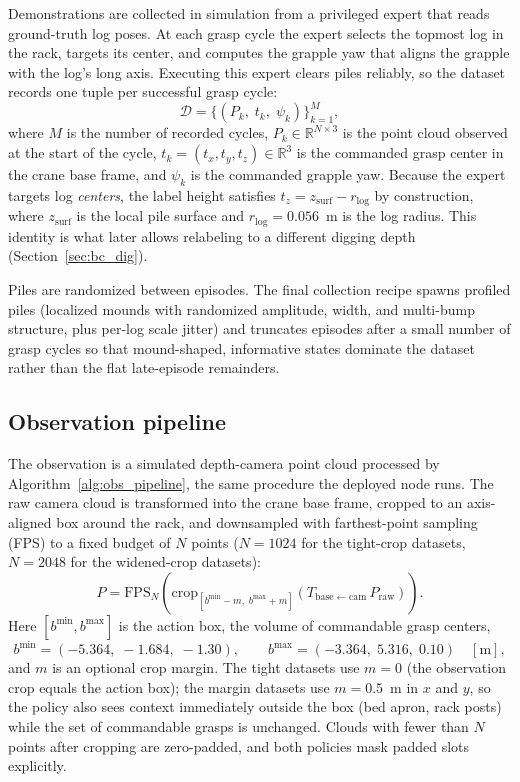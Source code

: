 Demonstrations are collected in simulation from a privileged expert that reads
ground-truth log poses. At each grasp cycle the expert selects the topmost log
in the rack, targets its center, and computes the grapple yaw that aligns the
grapple with the log's long axis. Executing this expert clears piles reliably,
so the dataset records one tuple per successful grasp cycle:
\begin{equation}
  \mathcal{D} = \big\{ (P_k,\; t_k,\; \psi_k) \big\}_{k=1}^{M},
\end{equation}
where $M$ is the number of recorded cycles,
$P_k \in \mathbb{R}^{N \times 3}$ is the point cloud observed at the
start of the cycle, $t_k = (t_x, t_y, t_z) \in \mathbb{R}^3$ is the commanded
grasp center in the crane base frame, and $\psi_k$ is the commanded grapple
yaw. Because the expert targets log \emph{centers}, the label height satisfies
$t_z = z_{\mathrm{surf}} - r_{\log}$ by construction, where
$z_{\mathrm{surf}}$ is the local pile surface and $r_{\log} = 0.056$~m is the
log radius. This identity is what later allows relabeling to a different
digging depth (Section~\ref{sec:bc_dig}).

Piles are randomized between episodes. The final collection recipe spawns
profiled piles (localized mounds with randomized amplitude, width, and
multi-bump structure, plus per-log scale jitter) and truncates episodes after a
small number of grasp cycles so that mound-shaped, informative states dominate
the dataset rather than the flat late-episode remainders.

\subsection{Observation pipeline}

The observation is a simulated depth-camera point cloud processed by
Algorithm~\ref{alg:obs_pipeline}, the same procedure the deployed node runs.
The raw camera cloud is transformed into the crane
base frame, cropped to an axis-aligned box around the rack, and downsampled
with farthest-point sampling (FPS) to a fixed budget of $N$ points ($N = 1024$
for the tight-crop datasets, $N = 2048$ for the widened-crop datasets):
\begin{equation}
  P = \mathrm{FPS}_N\!\left( \mathrm{crop}_{[b^{\min} - m,\; b^{\max} + m]}
      \left( T_{\mathrm{base} \leftarrow \mathrm{cam}} \, P_{\mathrm{raw}} \right) \right).
\end{equation}
Here $[b^{\min}, b^{\max}]$ is the action box, the volume of commandable grasp
centers,
\begin{equation}
  b^{\min} = (-5.364,\; -1.684,\; -1.30), \qquad
  b^{\max} = (-3.364,\; 5.316,\; 0.10) \quad [\mathrm{m}],
\end{equation}
and $m$ is an optional crop margin. The tight datasets use $m = 0$ (the
observation crop equals the action box); the margin datasets use $m = 0.5$~m
in $x$ and $y$, so the policy also sees context immediately outside the box
(bed apron, rack posts) while the set of commandable grasps is unchanged.
Clouds with fewer than $N$ points after cropping are zero-padded, and both
policies mask padded slots explicitly.

